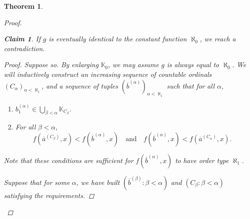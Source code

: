\documentclass{amsart}
\newtheorem{theorem}{Theorem}
\newtheorem{claim}{Claim}[theorem]
\theoremstyle{remark}
\theoremstyle{definition}
\theoremstyle{plain}
\newcommand{\bK}{\mathbb K}
\newcommand{\oa}{\overline{a}}
\newcommand{\ob}{\overline{b}}
\theoremstyle{plain}
\begin{document}
\begin{theorem}
\begin{proof}
        \begin{claim}
            If $g$ is eventually identical to the constant function $\aleph_0$, we reach a contradiction.
        \end{claim}
        
        \begin{proof}
        Suppose so. By enlarging $\bK_0$, we may assume $g$ is always equal to $\aleph_0$. We will inductively construct an increasing sequence of countable ordinals $(C_\alpha)_{\alpha<\aleph_1}$, and a sequence of tuples $(\ob^{(\alpha)})_{\alpha<\aleph_1}$ such that for all $\alpha$,
        \begin{enumerate}
        \item $b_1^{(\alpha)} \in \bigcup_{\beta<\alpha} \bK_{C_\beta}$.
        \item For all $\beta<\alpha$,
        \[f(\oa^{(C_\beta)},x) < f(\ob^{(\alpha)},x) \quad \text{and} \quad f(\ob^{(\alpha)},x)<f(\oa^{(C_\alpha)},x).\]
        \end{enumerate}
        Note that these conditions are sufficient for $f(\ob^{(\alpha)},x)$ to have order type $\aleph_1$.
        
        Suppose that for some $\alpha$, we have built $(\overline{b}^{(\beta)}:\beta<\alpha)$ and $(C_\beta: \beta<\alpha)$ satisfying the requirements.
        

\end{proof}
\end{proof}
\end{theorem}
\end{document}
